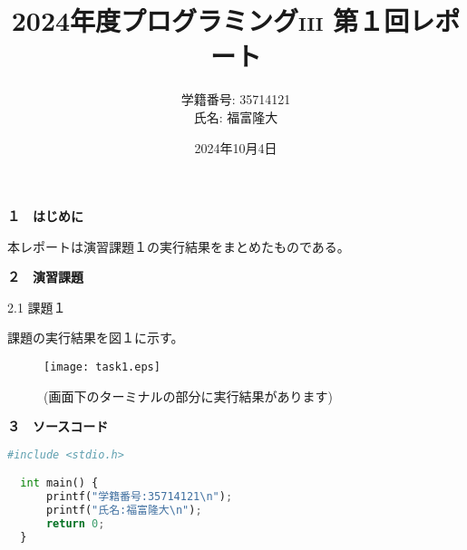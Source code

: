 \documentclass[a4j]{jsarticle}
\title{2024年度プログラミング\textsc{iii} 第１回レポート}
\author{学籍番号: 35714121 \\ 氏名: 福富隆大}
\date{2024年10月4日}
\begin{document}
\maketitle

\textbf{１　はじめに}

本レポートは演習課題１の実行結果をまとめたものである。

\textbf{２　演習課題}

\textmd{2.1 課題１}

課題の実行結果を図１に示す。

\begin{figure}[htbp]
  \centering
  \texttt{[image: task1.eps]}
  \caption{(画面下のターミナルの部分に実行結果があります)}
  \label{fig:sample}
\end{figure}

\textbf{３　ソースコード}

\begin{lstlisting}[language=Python, basicstyle=\ttfamily\small, frame=single]
  #include <stdio.h>

  int main() {
      printf("学籍番号:35714121\n");
      printf("氏名:福富隆大\n");
      return 0;
  }
\end{lstlisting}
\end{document}
